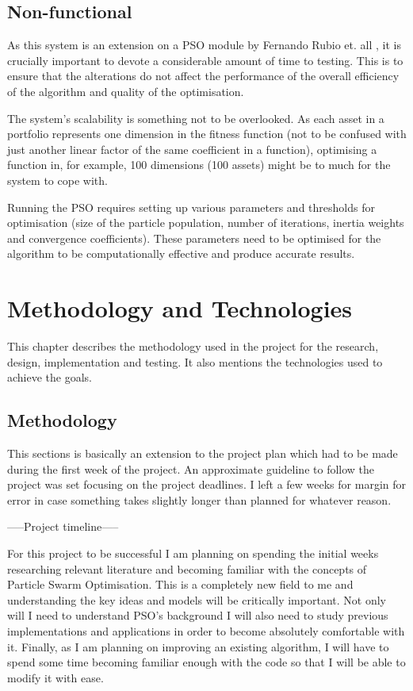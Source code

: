 \documentclass{pdfmx4020}
\begin{document}

  \section{Non-functional} %
  \label{sec:non_functional}
    As this system is an extension on a PSO module by Fernando Rubio et. all \cite{haskellPSO}, it is crucially important to devote a considerable amount of time to testing. This is to ensure that the alterations do not affect the performance of the overall efficiency of the algorithm and quality of the optimisation.  

    The system's scalability is something not to be overlooked. As each asset in a portfolio represents one dimension in the fitness function (not to be confused with just another linear factor of the same coefficient in a function), optimising a function in, for example, 100 dimensions (100 assets) might be to much for the system to cope with. 

    Running the PSO requires setting up various parameters and thresholds for optimisation (size of the particle population, number of iterations, inertia weights and convergence coefficients). These parameters need to be optimised for the algorithm to be computationally effective and produce accurate results. 


\chapter{Methodology and Technologies}
  This chapter describes the methodology used in the project for the research, design, implementation and testing. It also mentions the technologies used to achieve the goals. 
  \section{Methodology} %
  \label{sec:methodology}
  This sections is basically an extension to the project plan which had to be made during the first week of the project. An approximate guideline to follow the project was set focusing on the project deadlines. I left a few weeks for margin for error in case something takes slightly longer than planned for whatever reason. 

   -----Project timeline-----

  For this project to be successful I am planning on spending the initial weeks researching relevant literature and becoming familiar with the concepts of Particle Swarm Optimisation. This is a completely new field to me and understanding the key ideas and models will be critically important. Not only will I need to understand PSO's background I will also need to study previous implementations and applications in order to become absolutely comfortable with it. Finally, as I am planning on improving an existing algorithm, I will have to spend some time becoming familiar enough with the code so that I will be able to modify it with ease.
\end{document}
